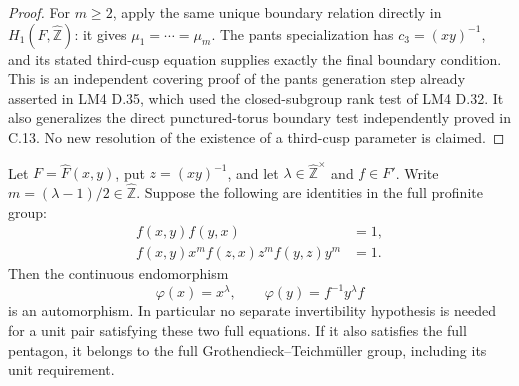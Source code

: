\begin{proof}
For $m\geq2$, apply the same unique boundary relation directly in $H_1(F,\widehat{\mathbb Z})$: it gives $\mu_1=\cdots=\mu_m$. The pants specialization has $c_3=(xy)^{-1}$, and its stated third-cusp equation supplies exactly the final boundary condition. This is an independent covering proof of the pants generation step already asserted in LM4 D.35, which used the closed-subgroup rank test of LM4 D.32. It also generalizes the direct punctured-torus boundary test independently proved in C.13. No new resolution of the existence of a third-cusp parameter is claimed.
\end{proof}


Let $F=\widehat F(x,y)$, put $z=(xy)^{-1}$, and let
$\lambda\in\widehat{\mathbb Z}^{\times}$ and $f\in F'$.
Write $m=(\lambda-1)/2\in\widehat{\mathbb Z}$.
Suppose the following are identities in the full profinite group:
\[
 \begin{split}
 f(x,y)f(y,x)&=1,\\
 f(x,y)x^m f(z,x)z^m f(y,z)y^m&=1.
 \end{split}                                                    \tag{C.30.1}
\]
Then the continuous endomorphism
\[
             \varphi(x)=x^\lambda,\qquad
             \varphi(y)=f^{-1}y^\lambda f
\]
is an automorphism. In particular no separate invertibility hypothesis
is needed for a unit pair satisfying these two full equations. If it
also satisfies the full pentagon, it belongs to the full
Grothendieck--Teichm\"uller group, including its unit requirement.

